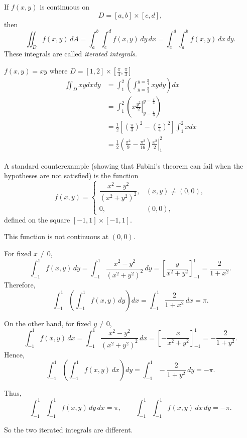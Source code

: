 \begin{theorem}
If \(f(x,y)\) is continuous on
\[
D=[a,b]\times[c,d],
\]
then
\[
\iint_D f(x,y)\,dA
=
\int_a^b \int_c^d f(x,y)\,dy\,dx
=
\int_c^d \int_a^b f(x,y)\,dx\,dy.
\]
These integrals are called \emph{iterated integrals}.
\end{theorem}
\begin{example}
    $f(x,y)=xy$ where $D=[1,2]\times\left[\frac\pi4,\frac\pi3\right]$
    \begin{align*}
        \iint_D xy dxdy &= \int_1^2 \left(\int_{y=\frac\pi3}^{y=\frac\pi4} xy dy\right)dx\\
        &= \int_1^2 \left( \left.x\frac{y^2}{2}\right|_{y=\frac\pi3}^{y=\frac\pi4}\right)\\
        &= \frac12\left[\left(\frac\pi3\right)^2-\left(\frac\pi4\right)^2\right]\int_1^2 xdx\\
        &= \frac12 \left(\frac{\pi^2}{9}-\frac{\pi^2}{16}\right)\left.\frac{x^2}{2}\right|_1^2
    \end{align*}
\end{example}
\begin{example}
    A standard counterexample (showing that Fubini's theorem can fail when the hypotheses are not satisfied) is the function
\[
f(x,y)=
\begin{cases}
\dfrac{x^2-y^2}{(x^2+y^2)^2}, & (x,y)\ne(0,0),\\[6pt]
0, & (0,0),
\end{cases}
\]
defined on the square \([-1,1]\times[-1,1]\).

This function is not continuous at \((0,0)\).

For fixed \(x\ne 0\),
\[
\int_{-1}^1 f(x,y)\,dy
=
\int_{-1}^1 \frac{x^2-y^2}{(x^2+y^2)^2}\,dy
=
\left[\frac{y}{x^2+y^2}\right]_{-1}^{1}
=
\frac{2}{1+x^2}.
\]
Therefore,
\[
\int_{-1}^1\left(\int_{-1}^1 f(x,y)\,dy\right)dx
=
\int_{-1}^1 \frac{2}{1+x^2}\,dx
=
\pi.
\]

On the other hand, for fixed \(y\ne 0\),
\[
\int_{-1}^1 f(x,y)\,dx
=
\int_{-1}^1 \frac{x^2-y^2}{(x^2+y^2)^2}\,dx
=
\left[-\frac{x}{x^2+y^2}\right]_{-1}^{1}
=
-\frac{2}{1+y^2}.
\]
Hence,
\[
\int_{-1}^1\left(\int_{-1}^1 f(x,y)\,dx\right)dy
=
\int_{-1}^1 -\frac{2}{1+y^2}\,dy
=
-\pi.
\]

Thus,
\[
\int_{-1}^1 \int_{-1}^1 f(x,y)\,dy\,dx = \pi,
\qquad
\int_{-1}^1 \int_{-1}^1 f(x,y)\,dx\,dy = -\pi.
\]

So the two iterated integrals are different.
\end{example}


